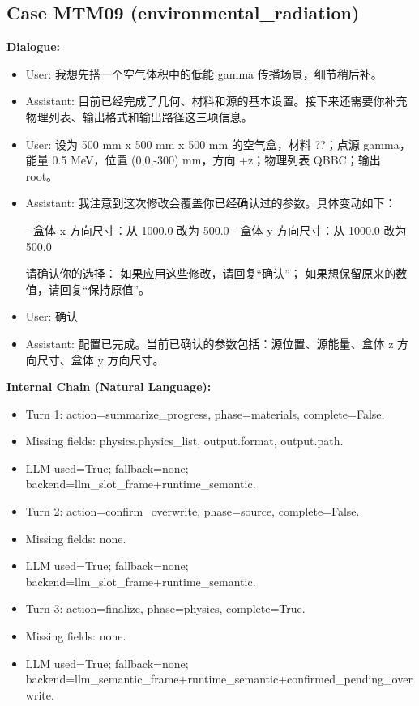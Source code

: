 \documentclass[11pt]{ctexart}
\begin{document}
\subsection{Case MTM09 (environmental\_radiation)}
\textbf{Dialogue:}
\begin{itemize}
\item User: 我想先搭一个空气体积中的低能 gamma 传播场景，细节稍后补。
\item Assistant: 目前已经完成了几何、材料和源的基本设置。接下来还需要你补充物理列表、输出格式和输出路径这三项信息。
\item User: 设为 500 mm x 500 mm x 500 mm 的空气盒，材料 ??；点源 gamma，能量 0.5 MeV，位置 (0,0,-300) mm，方向 +z；物理列表 QBBC；输出 root。
\item Assistant: 我注意到这次修改会覆盖你已经确认过的参数。具体变动如下：

- 盒体 x 方向尺寸：从 1000.0 改为 500.0
- 盒体 y 方向尺寸：从 1000.0 改为 500.0

请确认你的选择：
如果应用这些修改，请回复“确认”；
如果想保留原来的数值，请回复“保持原值”。
\item User: 确认
\item Assistant: 配置已完成。当前已确认的参数包括：源位置、源能量、盒体 z 方向尺寸、盒体 y 方向尺寸。
\end{itemize}
\textbf{Internal Chain (Natural Language):}
\begin{itemize}
\item Turn 1: action=summarize\_progress, phase=materials, complete=False.
\item Missing fields: physics.physics\_list, output.format, output.path.
\item LLM used=True; fallback=none; backend=llm\_slot\_frame+runtime\_semantic.
\item Turn 2: action=confirm\_overwrite, phase=source, complete=False.
\item Missing fields: none.
\item LLM used=True; fallback=none; backend=llm\_slot\_frame+runtime\_semantic.
\item Turn 3: action=finalize, phase=physics, complete=True.
\item Missing fields: none.
\item LLM used=True; fallback=none; backend=llm\_semantic\_frame+runtime\_semantic+confirmed\_pending\_overwrite.
\end{itemize}
\end{document}
